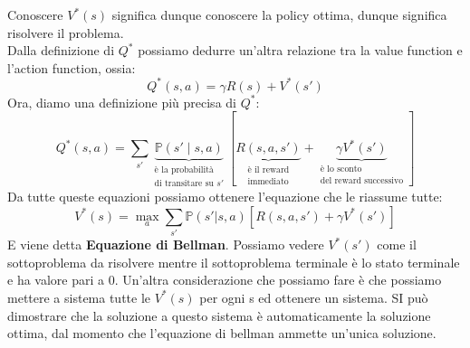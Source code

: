 Conoscere $V^*(s)$ significa dunque conoscere la policy ottima, dunque significa risolvere il problema.\\
Dalla definizione di $Q^*$ possiamo dedurre un'altra relazione tra la value function e l'action function, ossia:
\begin{equation}
    Q^*(s,a) = \gamma R(s) + V^*(s')
\end{equation}
Ora, diamo una definizione più precisa di $Q^*$:
\begin{equation}
    Q^*(s, a) = \sum_{s'} 
\underbrace{\mathbb{P}(s' \mid s, a)}_{\substack{\text{è la probabilità} \\ \text{di transitare su } s'}} 
[ 
\underbrace{R(s, a, s')}_{\substack{\text{è il reward} \\ \text{immediato}}} 
+ 
\underbrace{\gamma V^*(s')}_{\substack{\text{è lo sconto} \\ \text{del reward successivo}}} 
]
\end{equation}
Da tutte queste equazioni possiamo ottenere l'equazione che le riassume tutte:
\begin{equation}
    V^*(s) = \max_a \sum_{s'}\mathbb{P}(s'|s,a)[R(s,a,s') + \gamma V^*(s')]
\end{equation}
E viene detta \textbf{Equazione di Bellman}.
Possiamo vedere $V^*(s')$ come il sottoproblema da risolvere mentre il sottoproblema terminale è lo stato terminale e ha valore pari a 0.
Un'altra considerazione che possiamo fare è che possiamo mettere a sistema tutte le $V^*(s)$ per ogni s ed ottenere un sistema.
SI può dimostrare che la soluzione a questo sistema è automaticamente la soluzione ottima, dal momento che l'equazione di bellman ammette
un'unica soluzione.